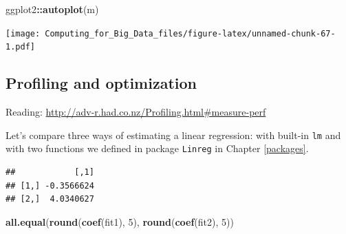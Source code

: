 \documentclass[]{book}
\newenvironment{Shaded}{\begin{snugshade}}{\end{snugshade}}
\newcommand{\KeywordTok}[1]{\textcolor[rgb]{0.13,0.29,0.53}{\textbf{#1}}}
\newcommand{\DataTypeTok}[1]{\textcolor[rgb]{0.13,0.29,0.53}{#1}}
\newcommand{\DecValTok}[1]{\textcolor[rgb]{0.00,0.00,0.81}{#1}}
\newcommand{\StringTok}[1]{\textcolor[rgb]{0.31,0.60,0.02}{#1}}
\newcommand{\OperatorTok}[1]{\textcolor[rgb]{0.81,0.36,0.00}{\textbf{#1}}}
\newcommand{\NormalTok}[1]{#1}
\theoremstyle{definition}
\theoremstyle{definition}
\theoremstyle{definition}
\theoremstyle{remark}
\begin{document}
\begin{Shaded}
\begin{Highlighting}[]
\NormalTok{ggplot2}\OperatorTok{::}\KeywordTok{autoplot}\NormalTok{(m)}
\end{Highlighting}
\end{Shaded}

\texttt{[image: Computing\_for\_Big\_Data\_files/figure-latex/unnamed-chunk-67-1.pdf]}

\subsection{Profiling and
optimization}\label{profiling-and-optimization}

Reading: \url{http://adv-r.had.co.nz/Profiling.html\#measure-perf}

Let's compare three ways of estimating a linear regression: with
built-in \texttt{lm} and with two functions we defined in package
\texttt{Linreg} in Chapter \ref{packages}.

\begin{Shaded}
\end{Shaded}

\begin{verbatim}
##            [,1]
## [1,] -0.3566624
## [2,]  4.0340627
\end{verbatim}

\begin{Shaded}
\begin{Highlighting}[]
\KeywordTok{all.equal}\NormalTok{(}\KeywordTok{round}\NormalTok{(}\KeywordTok{coef}\NormalTok{(fit1), }\DecValTok{5}\NormalTok{), }\KeywordTok{round}\NormalTok{(}\KeywordTok{coef}\NormalTok{(fit2), }\DecValTok{5}\NormalTok{))}
\end{Highlighting}
\end{Shaded}
\end{document}
